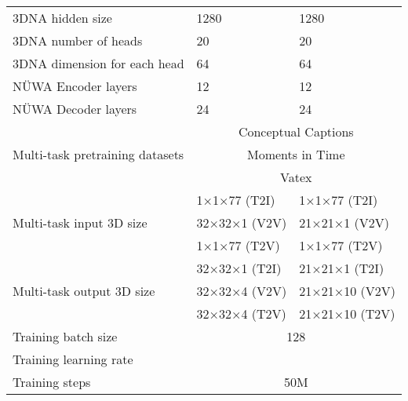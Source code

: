\documentclass[10pt,twocolumn,letterpaper]{article}
\begin{document}
\begin{table}[t]
\begin{tabular}{p{3.5cm}p{1.9cm}p{2.0cm}}
\midrule
3DNA  hidden size                          & 1280                                         & 1280                                         \\
3DNA   number of heads                     & 20                                           & 20                                           \\
3DNA   dimension for each head           & 64                                           & 64                                           \\
\midrule
NÜWA   Encoder layers                      & 12                                           & 12                                           \\
NÜWA   Decoder layers                      & 24                                           & 24                                           \\
\midrule
\multirow{3}{*}{Multi-task pretraining datasets} & \multicolumn{2}{c}{Conceptual Captions} \\
& \multicolumn{2}{c}{Moments in Time} \\
& \multicolumn{2}{c}{Vatex} \\
\midrule[0.1pt]
\multirow{3}{*}{Multi-task input 3D size}  & 1×1×77 (T2I)                                  & 1×1×77 (T2I)                                  \\
                                           & 32×32×1 (V2V)                                 & 21×21×1 (V2V)                                 \\
                                           & 1×1×77 (T2V)                                  & 1×1×77 (T2V)                                  \\
                                           \midrule[0.1pt]
\multirow{3}{*}{Multi-task output 3D size} & 32×32×1 (T2I)                                 & 21×21×1 (T2I)                                 \\
                                           & 32×32×4 (V2V)                                 & 21×21×10 (V2V)                                \\
                                           & 32×32×4 (T2V)                                 & 21×21×10 (T2V)                                \\
                                           \midrule
Training   batch size                      & \multicolumn{2}{c}{128}                                                                     \\
Training   learning rate                   & \multicolumn{2}{c}{}                                              \\
Training   steps                           & \multicolumn{2}{c}{50M}      \\         \bottomrule
                                                    
\end{tabular}
\end{table}
\end{document}

